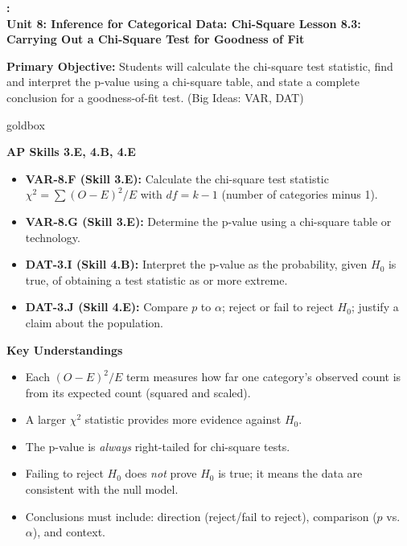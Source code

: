 \documentclass[10pt]{article}
\newcommand{\UnitNumberName}{Unit 8: Inference for Categorical Data: Chi-Square \quad}
\newcommand{\LessonNumberName}{Lesson 8.3: Carrying Out a Chi-Square Test for Goodness of Fit}
\begin{document}
\begin{center}
    {\Large\bfseries \CourseName: \SchoolYear \\
    {\small\bfseries \UnitNumberName \LessonNumberName}}
\end{center}

\begin{tcolorbox}[colback=sky, colframe=navy, boxrule=0.9pt, arc=2mm,
    left=2mm, right=2mm, top=1.5mm, bottom=1.5mm]
    \textbf{Primary Objective:} Students will calculate the chi-square test statistic,
    find and interpret the p-value using a chi-square table, and state a complete
    conclusion for a goodness-of-fit test.
    (Big Ideas: VAR, DAT)
\end{tcolorbox}

\renewcommand{\arraystretch}{1.6}
\begin{skillbox}{goldbox}
\begin{minipage}[t]{0.48\linewidth}
    \textbf{AP Skills 3.E, 4.B, 4.E}
    \begin{itemize}
        \item \textbf{VAR-8.F (Skill 3.E):} Calculate the chi-square test statistic
              $\chi^2 = \sum (O - E)^2 / E$ with $df = k - 1$ (number of categories minus 1).
        \item \textbf{VAR-8.G (Skill 3.E):} Determine the p-value using a chi-square
              table or technology.
        \item \textbf{DAT-3.I (Skill 4.B):} Interpret the p-value as the probability,
              given $H_0$ is true, of obtaining a test statistic as or more extreme.
        \item \textbf{DAT-3.J (Skill 4.E):} Compare $p$ to $\alpha$; reject or fail to
              reject $H_0$; justify a claim about the population.
    \end{itemize}
\end{minipage}
\hfill
\begin{minipage}[t]{0.48\linewidth}
    \textbf{Key Understandings}
    \begin{itemize}
        \item Each $(O - E)^2 / E$ term measures how far one category's observed
              count is from its expected count (squared and scaled).
        \item A larger $\chi^2$ statistic provides more evidence against $H_0$.
        \item The p-value is \emph{always} right-tailed for chi-square tests.
        \item Failing to reject $H_0$ does \emph{not} prove $H_0$ is true; it means
              the data are consistent with the null model.
        \item Conclusions must include: direction (reject/fail to reject),
              comparison ($p$ vs.\ $\alpha$), and context.
    \end{itemize}
\end{minipage}
\end{skillbox}
\end{document}
